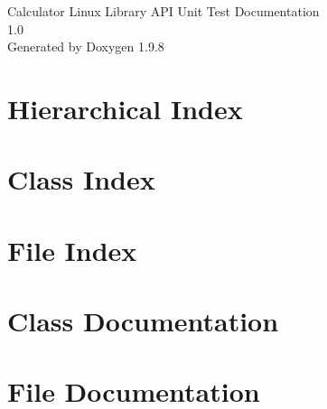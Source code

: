 \documentclass[twoside]{book}
\newcommand{\+}{\discretionary{\mbox{\scriptsize$\hookleftarrow$}}{}{}}
\newcommand{\clearemptydoublepage}{%
    \newpage{\pagestyle{empty}\cleardoublepage}%
  }
\begin{document}
  \raggedbottom
    \hypersetup{pageanchor=false,
                bookmarksnumbered=true,
                pdfencoding=unicode
               }
  \begin{titlepage}
  \vspace*{7cm}
  \begin{center}%
  {\Large Calculator Linux Library API Unit Test Documentation}\\
  [1ex]\large 1.\+0 \\
  \vspace*{1cm}
  {\large Generated by Doxygen 1.9.8}\\
  \end{center}
  \end{titlepage}
  \clearemptydoublepage
  \tableofcontents
  \clearemptydoublepage
  \hypersetup{pageanchor=true}

\chapter{Hierarchical Index}

\chapter{Class Index}

\chapter{File Index}

\chapter{Class Documentation}



\chapter{File Documentation}







  \backmatter
  \newpage
  \clearemptydoublepage
  \printindex
\end{document}
